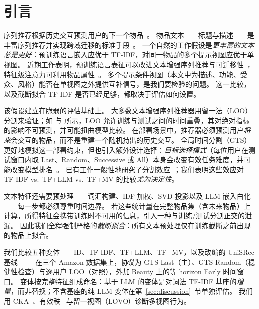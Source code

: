 \documentclass[sigconf,natbib=true,anonymous]{acmart}
\newcommand{\tfidf}{\textsc{TF-IDF}\xspace}
\newcommand{\llm}{\textsc{LLM}\xspace}
\newcommand{\tfllm}{\textsc{TF+LLM}\xspace}
\newcommand{\tfmv}{\textsc{TF+MV}\xspace}
\begin{document}
\maketitle

\section{引言}
\label{sec:intro}

序列推荐根据历史交互预测用户的下一个物品~\cite{kang2018sasrec,sun2019bert4rec,hidasi2016gru4rec}。
物品文本——标题与描述——是丰富序列推荐并实现跨域迁移的标准手段~\cite{hou2022unisrec,li2023recformer}。
一个自然的工作假设是\emph{更丰富的文本总是更好}：预训练语言嵌入应优于 \tfidf，对同一物品的多个提示视图应优于单视图。
近期工作表明，预训练语言表征可以改进文本增强序列推荐与可迁移性~\cite{hou2022unisrec,li2023recformer}，特征级注意力可利用物品属性~\cite{zhang2019fdsa}。
多个提示条件视图（本文中为描述、功能、受众、风格）能否在单视图之外提供互补信号，是我们要检验的问题。
这一比较，以及截断拟合 \tfidf 是否已经足够，都取决于评估如何设置。

该假设建立在脆弱的评估基础上。
大多数文本增强序列推荐器用留一法（LOO）分割来验证；如 \citet{ji2023evaluation} 与 \citet{sun2023reevaluation} 所示，LOO 允许训练与测试之间的时间重叠，其对绝对指标的影响不可预测，并可能扭曲模型比较。
在部署场景中，推荐器必须预测用户\emph{将来}会交互的物品，而不是重建一个随机持出的历史交互。
全局时间分割（GTS）更好地模拟这一部署约束，但也引入额外设计选择：\emph{目标选择模式}（每位用户在测试窗口内取 Last、Random、Successive 或 All）本身会改变有效任务难度，并可能改变模型排名~\cite{gusak2025time}。
已有工作一般性地研究了分割效应~\cite{meng2020temporal,ji2023evaluation}；我们表明这些效应对 \tfidf vs.\ \tfllm vs.\ \tfmv 的比较\emph{尤为决定性}。

文本特征还需要预处理——词汇构建、IDF 加权、SVD 投影以及 LLM 嵌入白化——每一步都必须尊重时间边界。
若这些统计量在完整物品集（含未来物品）上计算，所得特征会携带训练时不可用的信息，引入一种与训练/测试分割正交的泄漏。
因此我们全程强制严格的\emph{截断拟合}：所有文本预处理仅在训练截断之前出现的物品上拟合。

我们比较五种变体——ID、\tfidf、\tfllm、\tfmv，以及改编的 UniSRec 基线~\cite{hou2022unisrec}——在三个 Amazon 数据集上，协议为 GTS-Last（主）、GTS-Random（稳健性检查）与逐用户 LOO（对照），外加 Beauty 上的等 horizon Early 时间窗口。
变体按完整特征组成命名：基于 \llm 的变体是对词法 \tfidf 基座的\emph{增量}，而非替换；不含基座的纯 LLM 变体在第~\ref{sec:discussion}~节单独评估。
我们用 CKA~\cite{kornblith2019cka}、有效秩~\cite{roy2007effective} 与留一视图（LOVO）诊断多视图行为。
\end{document}
